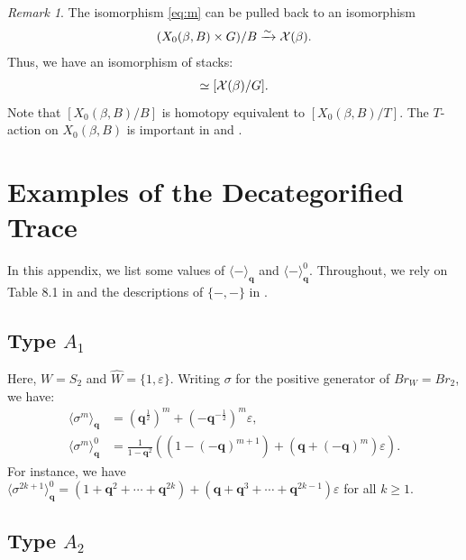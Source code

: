 \documentclass[a4paper,10pt,leqno]{amsart}
\theoremstyle{plain}
\theoremstyle{plain}
\theoremstyle{plain}
\theoremstyle{definition}
\theoremstyle{remark}
\newtheorem{rem}[thm]{Remark}
\newcommand{\Br}{\mathit{Br}}
\newcommand{\Q}{\bm{q}}
\newcommand{\Tr}[1]{\langle{#1}\rangle_{\Q}}
\begin{document}
\begin{rem}
The isomorphism \eqref{eq:m} can be pulled back to an isomorphism
\begin{align}
(X_0(\beta, B) \times G)/B
\xrightarrow{\sim}
\cal{X}(\beta).
\end{align}
Thus, we have an isomorphism of stacks:
\begin{align}
[X_0(\beta, B)/B] \simeq [\cal{X}(\beta)/G].
\end{align}
Note that $[X_0(\beta, B)/B]$ is homotopy equivalent to $[X_0(\beta, B)/T]$.
The $T$-action on $X_0(\beta, B)$ is important in \cite{mellit} and \cite{cggs}.
\end{rem}

\newpage
\section{Examples of the Decategorified Trace}\label{sec:examples}

In this appendix, we list some values of $\Tr{-}$ and $\Tr{-}^0$.
Throughout, we rely on Table 8.1 in \cite{gp} and the descriptions of $\{-, -\}$ in \cite[Ch.\ 4]{lusztig_1984}.

\subsection*{Type $A_1$}

Here, $W = S_2$ and $\hat{W} = \{1, \varepsilon\}$.
Writing $\sigma$ for the positive generator of $\Br_W = \Br_2$, we have:
\begin{align}
\Tr{\sigma^m} &= (\Q^{\frac{1}{2}})^m + (-\Q^{-\frac{1}{2}})^m \varepsilon,\\
\Tr{\sigma^m}^0 &= \frac{1}{1 - \Q^2}
((1 - (-\Q)^{m + 1}) + (\Q + (-\Q)^m)\varepsilon).
\end{align}
For instance, we have $\Tr{\sigma^{2k + 1}}^0 = (1 + \Q^2 + \cdots + \Q^{2k}) + (\Q + \Q^3 + \cdots + \Q^{2k - 1})\varepsilon$ for all $k \geq 1$.

\subsection*{Type $A_2$}
\end{document}
